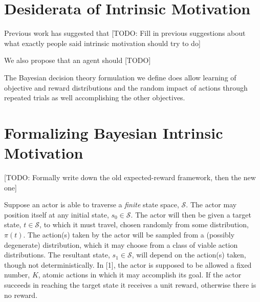 \documentclass{article}
\newcommand{\Ss}{\mathcal{S}}
\begin{document}
\section{Desiderata of Intrinsic Motivation}

Previous work has suggested that [TODO: Fill in previous suggestions about what exactly people said intrinsic motivation should try to do]

We also propose that an agent should [TODO]



The Bayesian decision theory formulation we define does allow learning of objective and reward distributions and the random impact of actions through repeated trials as well accomplishing the other objectives.


\section{Formalizing Bayesian Intrinsic Motivation}

[TODO: Formally write down the old expected-reward framework, then the new one]

Suppose an actor is able to traverse a \textit{finite} state space, $\Ss$. 
The actor may position itself at any initial state, $s_0\in \Ss$. 
The actor will then be given a target state, $t\in \Ss$, to which it must travel, chosen randomly from some distribution, $\pi(t)$. 
The action(s) taken by the actor will be sampled from a (possibly degenerate) distribution, which it may choose from a class of viable action distributions. 
The resultant state, $s_1\in\Ss$, will depend on the action(s) taken, though not deterministically.  
In [1], the actor is supposed to be allowed a fixed number, $K$, atomic actions in which it may accomplish its goal.
If the actor succeeds in reaching the target state it receives a unit reward, otherwise there is no reward.
\end{document}
